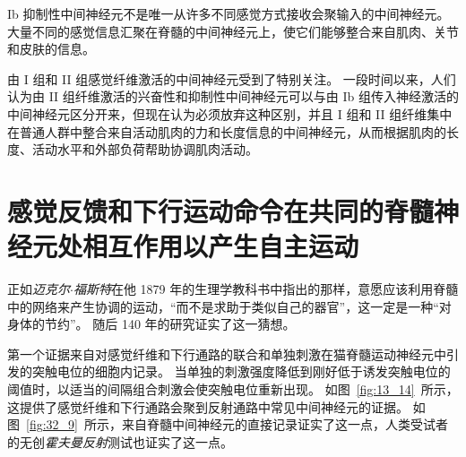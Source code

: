 Ib 抑制性中间神经元不是唯一从许多不同感觉方式接收会聚输入的中间神经元。
大量不同的感觉信息汇聚在脊髓的中间神经元上，使它们能够整合来自肌肉、关节和皮肤的信息。


由 I 组和 II 组感觉纤维激活的中间神经元受到了特别关注。
一段时间以来，人们认为由 II 组纤维激活的兴奋性和抑制性中间神经元可以与由 Ib 组传入神经激活的中间神经元区分开来，但现在认为必须放弃这种区别，并且 I 组和 II 组纤维集中在普通人群中整合来自活动肌肉的力和长度信息的中间神经元，从而根据肌肉的长度、活动水平和外部负荷帮助协调肌肉活动。



\section{感觉反馈和下行运动命令在共同的脊髓神经元处相互作用以产生自主运动}

正如\textit{迈克尔$\cdot$福斯特}在他 1879 年的生理学教科书中指出的那样，意愿应该利用脊髓中的网络来产生协调的运动，“而不是求助于类似自己的器官”，这一定是一种“对身体的节约”。
随后 140 年的研究证实了这一猜想。


第一个证据来自对感觉纤维和下行通路的联合和单独刺激在猫脊髓运动神经元中引发的突触电位的细胞内记录。
当单独的刺激强度降低到刚好低于诱发突触电位的阈值时，以适当的间隔组合刺激会使突触电位重新出现。
如图~\ref{fig:13_14}~所示，这提供了感觉纤维和下行通路会聚到反射通路中常见中间神经元的证据。
如图~\ref{fig:32_9}~所示，来自脊髓中间神经元的直接记录证实了这一点，人类受试者的无创\textit{霍夫曼反射}测试也证实了这一点。


